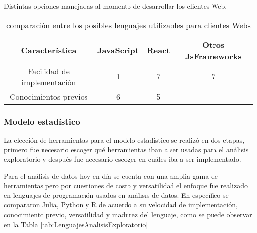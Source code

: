    \begin{table}[ht]
        \caption[Comparativa de posibles lenguajes nivel cliente Web]{comparación entre
        los posibles lenguajes utilizables para clientes Webs}
        \label{tab:LenguajesCliente}
        \begin{center}
            Distintas opciones manejadas al momento de desarrollar los clientes Web.\\

            \vspace{0.3cm}
            \begin{tabular}{|c|c|c|c|}
                \hline
                Característica              & JavaScript & React & Otros JsFrameworks\\\hline
                \hline
                Facilidad de implementación & 1         & 7     &  7\\\hline
                Conocimientos previos       & 6         & 5     &  - \\\hline
            \end{tabular}
        \end{center}
    \end{table}



    \subsubsection{Modelo estadístico}
    La elección de herramientas para el modelo estadístico se realizó en dos
    etapas, primero fue necesario escoger qué herramientas iban a ser usadas
    para el análisis exploratorio y después fue necesario escoger en cuáles iba
    a ser implementado.

    Para el análisis de datos hoy en día se cuenta con una amplia gama de
    herramientas pero por cuestiones de costo y versatilidad el enfoque fue
    realizado en lenguajes de programación usados en análisis de datos. En
    específico se compararon Julia, Python y R de acuerdo a su velocidad de
    implementación, conocimiento previo, versatilidad y madurez del lenguaje, como
    se puede observar en la Tabla \ref{tab:LenguajesAnalisisExploratorio}

